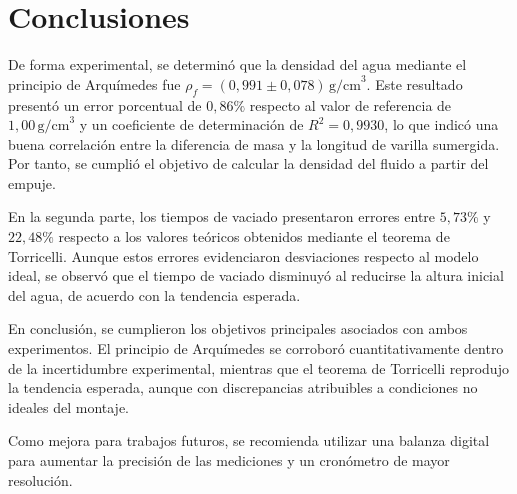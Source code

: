 \section{Conclusiones}

De forma experimental, se determinó que la densidad del agua mediante el principio de Arquímedes fue $\rho_f=(0{,}991\pm0{,}078)\,\text{g/cm}^3$. Este resultado presentó un error porcentual de $0{,}86\%$ respecto al valor de referencia de $1{,}00\,\text{g/cm}^3$ y un coeficiente de determinación de $R^2=0{,}9930$, lo que indicó una buena correlación entre la diferencia de masa y la longitud de varilla sumergida. Por tanto, se cumplió el objetivo de calcular la densidad del fluido a partir del empuje.

En la segunda parte, los tiempos de vaciado presentaron errores entre $5{,}73\%$ y $22{,}48\%$ respecto a los valores teóricos obtenidos mediante el teorema de Torricelli. Aunque estos errores evidenciaron desviaciones respecto al modelo ideal, se observó que el tiempo de vaciado disminuyó al reducirse la altura inicial del agua, de acuerdo con la tendencia esperada.

En conclusión, se cumplieron los objetivos principales asociados con ambos experimentos. El principio de Arquímedes se corroboró cuantitativamente dentro de la incertidumbre experimental, mientras que el teorema de Torricelli reprodujo la tendencia esperada, aunque con discrepancias atribuibles a condiciones no ideales del montaje.

Como mejora para trabajos futuros, se recomienda utilizar una balanza digital para aumentar la precisión de las mediciones y un cronómetro de mayor resolución.
